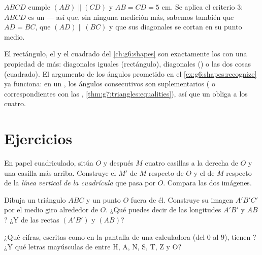 \begin{example}\label{ex:g7:central:recognize}
$ABCD$ cumple $(AB) \parallel (CD)$ y $AB = CD = 5$ cm. Se aplica el criterio 3:
$ABCD$ es un  --- así que, sin ninguna medición
más, sabemos también que $AD = BC$, que $(AD) \parallel (BC)$ y que sus
diagonales se cortan en su punto medio.
\end{example}

\begin{remark}
El rectángulo, el  y el cuadrado del \cref{ch:g6:shapes} son exactamente
los  con una propiedad de más: diagonales iguales
(rectángulo), diagonales  () o las dos cosas (cuadrado). El
argumento de los ángulos prometido en el \cref{ex:g6:shapes:recognize} ya funciona:
en un , los ángulos consecutivos son suplementarios
( o correspondientes con las ,
\cref{thm:g7:triangles:equalities}), así que un  obliga a los
cuatro.
\end{remark}

\section{Ejercicios}

\begin{exercise}[$\star$]\label{exo:g7:central:1}
En papel cuadriculado, sitúa $O$ y después $M$ cuatro casillas a la derecha de $O$ y una
casilla más arriba. Construye el  $M'$ de $M$ respecto de $O$ y el
 de $M$ respecto de la \emph{línea vertical de la cuadrícula} que pasa por $O$.
Compara las dos imágenes.
\end{exercise}

\begin{exercise}[$\star$]\label{exo:g7:central:2}
Dibuja un triángulo $ABC$ y un punto $O$ fuera de él. Construye su imagen
$A'B'C'$ por el medio giro alrededor de $O$. ¿Qué puedes decir de las
longitudes $A'B'$ y $AB$? ¿Y de las rectas $(A'B')$ y $(AB)$?
\end{exercise}

\begin{exercise}[$\star$]\label{exo:g7:central:3}
¿Qué cifras, escritas como en la pantalla de una calculadora (del $0$ al $9$), tienen
? ¿Y qué letras mayúsculas de entre H, A, N, S, T, Z y O?
\end{exercise}

